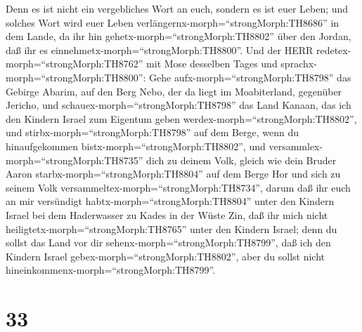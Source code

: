  Denn es ist nicht ein vergebliches Wort an euch, sondern
es ist euer Leben; und solches Wort wird euer Leben
verlängernx-morph=``strongMorph:TH8686'' in dem Lande, da ihr hin
gehetx-morph=``strongMorph:TH8802'' über den Jordan, daß ihr es
einnehmetx-morph=``strongMorph:TH8800''.  Und der HERR
redetex-morph=``strongMorph:TH8762'' mit Mose desselben Tages und
sprachx-morph=``strongMorph:TH8800'':  Gehe
aufx-morph=``strongMorph:TH8798'' das Gebirge Abarim, auf den Berg Nebo,
der da liegt im Moabiterland, gegenüber Jericho, und
schauex-morph=``strongMorph:TH8798'' das Land Kanaan, das ich den
Kindern Israel zum Eigentum geben werdex-morph=``strongMorph:TH8802'',
 und stirbx-morph=``strongMorph:TH8798'' auf dem Berge,
wenn du hinaufgekommen bistx-morph=``strongMorph:TH8802'', und
versammlex-morph=``strongMorph:TH8735'' dich zu deinem Volk, gleich wie
dein Bruder Aaron starbx-morph=``strongMorph:TH8804'' auf dem Berge Hor
und sich zu seinem Volk versammeltex-morph=``strongMorph:TH8734'',
 darum daß ihr euch an mir versündigt
habtx-morph=``strongMorph:TH8804'' unter den Kindern Israel bei dem
Haderwasser zu Kades in der Wüste Zin, daß ihr mich nicht
heiligtetx-morph=``strongMorph:TH8765'' unter den Kindern Israel;
 denn du sollst das Land vor dir
sehenx-morph=``strongMorph:TH8799'', daß ich den Kindern Israel
gebex-morph=``strongMorph:TH8802'', aber du sollst nicht
hineinkommenx-morph=``strongMorph:TH8799''.

\hypertarget{section-32}{%
\section{33}\label{section-32}}

